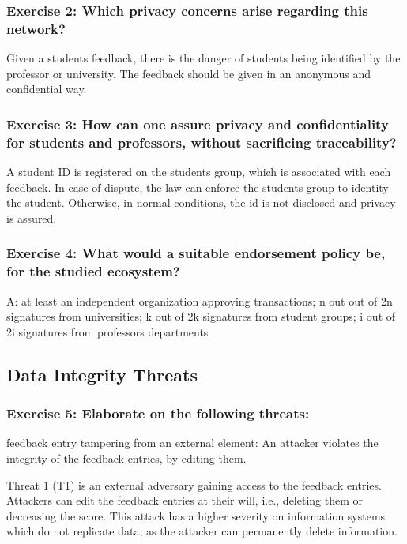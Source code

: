 \documentclass[12pt,a4paper]{article}
\begin{document}
\subsubsection*{Exercise 2: Which privacy concerns arise regarding this network?}

Given a students feedback, there is the danger of students being identified by the professor or university. The feedback should be given in an anonymous and confidential way. 

\subsubsection*{Exercise 3: How can one assure privacy and confidentiality for students and professors, without sacrificing traceability?}

A student ID is registered on the students group, which is associated with each feedback. In case of dispute, the law can enforce the students group to identity the student. Otherwise, in normal conditions, the id is not disclosed and privacy is assured. 

\subsubsection*{Exercise 4: What would a suitable endorsement policy be, for the studied ecosystem?}
A: at least an independent organization approving transactions; n out out of 2n signatures from universities; k out of 2k signatures from student groups; i out of 2i signatures from professors departments

\subsection{Data Integrity Threats}

\subsubsection*{Exercise 5: Elaborate on the following threats:}

\begin{threat}{feedback entry tampering from an external element:} An attacker violates the integrity of the feedback entries, by editing them. 
\end{threat}
   

Threat 1 (T1) is an external adversary gaining access to the feedback entries. Attackers can edit the feedback entries at their will, i.e., deleting them or decreasing the score. This attack has a higher severity on information systems which do not replicate data, as the attacker can permanently delete information. 
\end{document}
